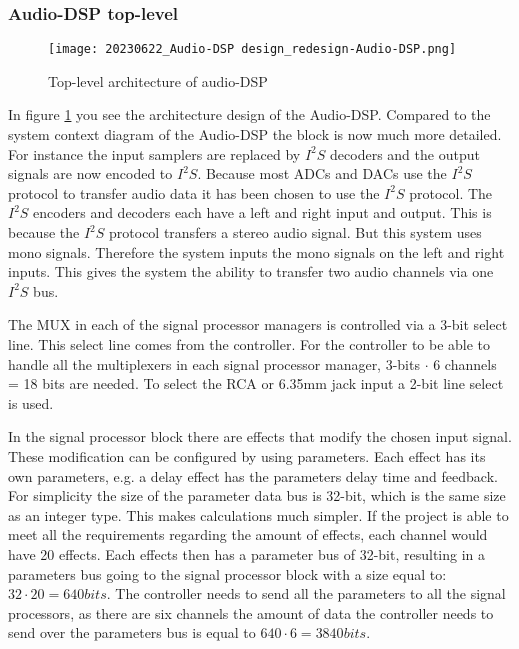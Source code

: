 \subsubsection{Audio-DSP top-level}
\begin{figure}[ht]
    \texttt{[image: 20230622\_Audio-DSP design\_redesign-Audio-DSP.png]}\\    
    \caption{Top-level architecture of audio-DSP}
    \label{fig:arch-top}
\end{figure}

In figure \ref{fig:arch-top} you see the architecture design of the Audio-DSP. Compared to the system context diagram of the Audio-DSP the block is now much more detailed. For instance the input samplers are replaced by $I^2S$ decoders and the output signals are now encoded to $I^2S$. Because most ADCs and DACs use the $I^2S$ protocol to transfer audio data it has been chosen to use the $I^2S$ protocol. The $I^2S$ encoders and decoders each have a left and right input and output. This is because the $I^2S$ protocol transfers a stereo audio signal. But this system uses mono signals. Therefore the system inputs the mono signals on the left and right inputs. This gives the system the ability to transfer two audio channels via one $I^2S$ bus.

The MUX in each of the signal processor managers is controlled via a 3-bit select line. This select line comes from the controller. For the controller to be able to handle all the multiplexers in each signal processor manager, 3-bits $\cdot$ 6 channels = 18 bits are needed. To select the RCA or 6.35mm jack input a 2-bit line select is used.

In the signal processor block there are effects that modify the chosen input signal. These modification can be configured by using parameters. Each effect has its own parameters, e.g. a delay effect has the parameters delay time and feedback. For simplicity the size of the parameter data bus is 32-bit, which is the same size as an integer type. This makes calculations much simpler. If the project is able to meet all the requirements regarding the amount of effects, each channel would have 20 effects. Each effects then has a parameter bus of 32-bit, resulting in a parameters bus going to the signal processor block with a size equal to: $32\cdot20=640 bits$. The controller needs to send all the parameters to all the signal processors, as there are six channels the amount of data the controller needs to send over the parameters bus is equal to $640\cdot6=3840 bits$. 

